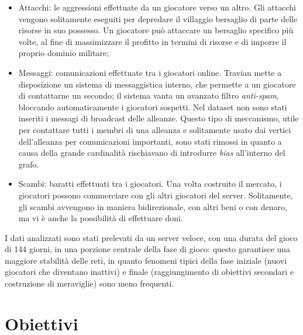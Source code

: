 \begin{itemize}
	\item Attacchi: le aggressioni effettuate da un giocatore verso un altro. Gli attacchi vengono solitamente eseguiti per depredare il villaggio bersaglio di parte delle risorse in suo possesso. Un giocatore può attaccare un bersaglio specifico più volte, al fine di massimizzare il profitto in termini di risorse e di imporre il proprio dominio militare;
	\item Messaggi: comunicazioni effettuate tra i giocatori online. Travian mette a disposizione un sistema di messaggistica interno, che permette a un giocatore di contattarne un secondo; il sistema vanta un avanzato filtro \textit{anti-spam}, bloccando automaticamente i giocatori sospetti.
	Nel dataset non sono stati inseriti i messagi di broadcast delle alleanze. Questo tipo di meccanismo, utile per contattare tutti i membri di una alleanza e solitamente usato dai vertici dell'alleanza per comunicazioni importanti, sono stati rimossi in quanto a causa della grande cardinalità rischiavano di introdurre \textit{bias} all'interno del grafo.
	\item Scambi: baratti effettuati tra i giocatori. Una volta costruito il mercato, i giocatori possono commerciare con gli altri giocatori del server. Solitamente, gli scambi avvengono in maniera bidirezionale, con altri beni o con denaro, ma vi è anche la possibilità di effettuare doni.
\end{itemize}
I dati analizzati sono stati prelevati da un server veloce, con una durata del gioco di 144 giorni, in una porzione centrale della fase di gioco: questo garantisce una maggiore stabilità delle reti, in quanto fenomeni tipici della fase iniziale (nuovi giocatori che diventano inattivi) e finale (raggiungimento di obiettivi secondari e costruzione di meraviglie) sono meno frequenti.

\section{Obiettivi}
